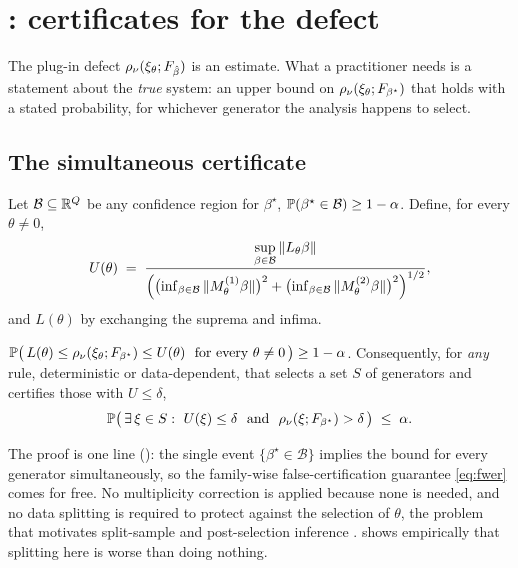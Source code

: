 \section{\symcert: certificates for the defect}
\label{sec:method}

The plug-in defect $\rho_\nu(\xi_\theta; F_{\hat{\beta}})$ is an estimate. What a
practitioner needs is a statement about the \emph{true} system: an upper bound
on $\rho_\nu(\xi_\theta; F_{\beta^\star})$ that holds with a stated
probability, for whichever generator the analysis happens to select.

\subsection{The simultaneous certificate}

Let $\mathcal B \subseteq \mathbb{R}^Q$ be any confidence region for $\beta^\star$,
$\mathbb{P}(\beta^\star \in \mathcal B) \ge 1-\alpha$. Define, for every
$\theta \neq 0$,
\begin{equation}
  U(\theta) \;=\;
  \frac{\displaystyle \sup_{\beta \in \mathcal B} \|L_\theta \beta\|}
       {\Bigl(\bigl(\inf_{\beta \in \mathcal B} \|M^{(1)}_\theta\beta\|\bigr)^{2}
        + \bigl(\inf_{\beta \in \mathcal B}\|M^{(2)}_\theta\beta\|\bigr)^{2}
        \Bigr)^{1/2}},
  \label{eq:U}
\end{equation}
and $L(\theta)$ by exchanging the suprema and infima.

\begin{proposition}
\label{prop:simultaneous}
$\mathbb{P}\bigl(\, L(\theta) \le \rho_\nu(\xi_\theta;F_{\beta^\star}) \le
U(\theta) \ \text{ for every } \theta \neq 0 \,\bigr) \ge 1-\alpha$.
Consequently, for \emph{any} rule, deterministic or data-dependent, that selects a set $S$ of generators and certifies those with $U \le \delta$,
\begin{equation}
  \mathbb{P}\bigl(\, \exists\, \xi \in S:\ U(\xi) \le \delta \ \text{ and } \
  \rho_\nu(\xi;F_{\beta^\star}) > \delta \,\bigr) \;\le\; \alpha .
  \label{eq:fwer}
\end{equation}
\end{proposition}

The proof is one line (): the single event $\{\beta^\star \in
\mathcal B\}$ implies the bound for every generator simultaneously, so the
family-wise false-certification guarantee \eqref{eq:fwer} comes for free. No
multiplicity correction is applied because none is needed, and no data
splitting is required to protect against the selection of $\theta$, the
problem that motivates split-sample and post-selection inference
\citep{berk2013valid,lee2016exact,
meinshausen2009pvalues,andrews2024inference}.  shows
empirically that splitting here is worse than doing nothing.

